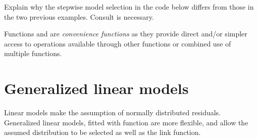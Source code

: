 \documentclass[krantz2]{krantz}\usepackage{knitr}
\begin{document}
\begin{playground}
Explain why the stepwise model selection in the code below differs from those in the two previous examples. Consult  is necessary.

\begin{knitrout}\footnotesize
{}\color{fgcolor}\begin{kframe}
\begin{alltt}
 \hlkwb{<-}
        \hlstd{=} \hlstd{(}  \hlopt{~} 
                      \hlopt{~}  \hlopt{+} \hlopt{^}\hlstd{)} \hlopt{+} \hlopt{^}\hlstd{)} \hlopt{+} \hlopt{^}\hlstd{)))}
\end{alltt}
\end{kframe}
\end{knitrout}

\end{playground}

Functions  and  are \emph{convenience functions} as they provide direct and/or simpler access to operations available through other functions or combined use of multiple functions.

\section{Generalized linear models}\label{sec:stat:GLM}

Linear models make the assumption of normally distributed residuals. Generalized linear models, fitted with function  are more flexible, and allow the assumed distribution to be selected as well as the link function.
\end{document}
